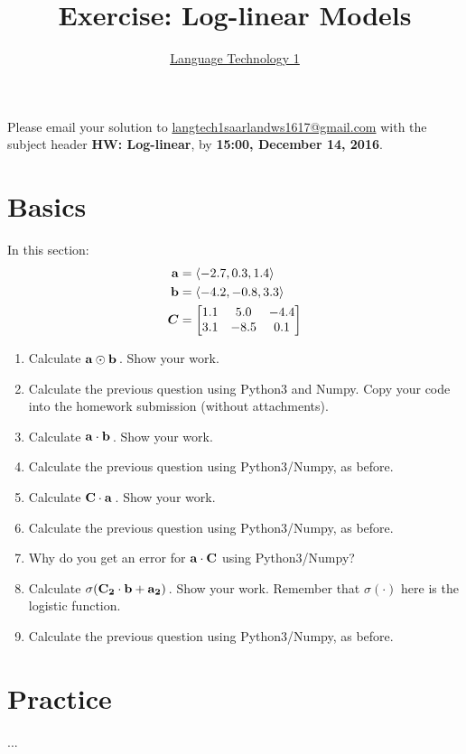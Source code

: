 \documentclass[paper=a4, fontsize=11pt]{article}
\title{Exercise: Log-linear Models}
\author{\href{https://github.com/jonsafari/lt1}{Language Technology 1}}
\date{}
\begin{document}
\maketitle
\begin{spacing}{1.8}

Please email your solution to \url{langtech1saarlandws1617@gmail.com} with the subject header \textbf{HW: Log-linear}, by \textbf{15:00, December 14, 2016}.


\section{Basics}
In this section:
\begin{align}
{\bf a} &= \langle -2.7, 0.3, 1.4 \rangle \\
{\bf b} &= \langle -4.2, -0.8, 3.3 \rangle \\
{\boldsymbol C} &= \begin{bmatrix} 1.1 & 5.0 & -4.4 \\ 3.1 & -8.5 & 0.1 \end{bmatrix}
\end{align}

\begin{enumerate}
	\item Calculate $\bf a \odot b$\,.  Show your work.
	\item Calculate the previous question using Python3 and Numpy.  Copy your code into the homework submission (without attachments).
	\item Calculate $\bf a \cdot b$\,.  Show your work.
	\item Calculate the previous question using Python3/Numpy, as before.
	\item Calculate $\bf C \cdot a$\,.  Show your work.
	\item Calculate the previous question using Python3/Numpy, as before.
	\item Why do you get an error for $\bf a \cdot C$ using Python3/Numpy?
	\item Calculate $\sigma(\bf C_2 \cdot b + a_2)$\,. Show your work. Remember that $\sigma(\cdot)$ here is the logistic function.
	\item Calculate the previous question using Python3/Numpy, as before.
\end{enumerate}

\section{Practice}
...

\end{spacing}
\end{document}
